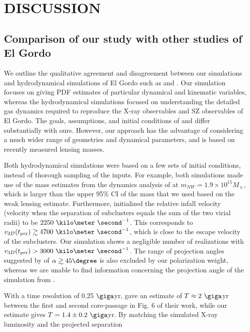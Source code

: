 \documentclass[letterpaper,useAMS,usenatbib]{mn2e}
\begin{document}
\section{DISCUSSION}
\subsection{Comparison of our study with other studies of El Gordo}
We outline the qualitative agreement and disagreement between our
simulations and hydrodynamical simulations of El Gordo such as
\cite{Donnert13} and \cite{Molnar14}. Our simulation focuses on giving PDF
estimates of particular dynamical and kinematic variables, whereas the
hydrodynamical simulations focused on understanding the detailed gas dynamics
required to reproduce the X-ray observables and SZ 
observables of El Gordo. The goals,
assumptions, and initial conditions of \cite{Donnert13} and \cite{Molnar14}
differ substantially with ours. However, our approach has the advantage of considering a much wider range of geometries and dynamical parameters, and is based on recently measured lensing masses.
\par 
Both hydrodynamical simulations were based on a few sets of initial
conditions, instead of thorough sampling of the inputs. For example, both
simulations made use of the mass estimates from the dynamics analysis
of  at $m_{NW} = 1.9 \times
10^{15} M_{\sun}$,
which is larger than the upper 95\% CI of the mass that we used based on
the weak lensing estimate.
Furthermore, \cite{Molnar14} initialized the relative infall velocity
(velocity when the separation of subclusters equals the sum of the two virial
radii) to be $2250~\kilo \meter~ \second^{-1}$. This corresponds to
$v_{3D}(t_{\rm per}) \gtrsim 4700~\kilo \meter~\second^{-1}$, which is close to
the escape velocity of the subclusters. 
Our simulation shows 
a negligible number of realizations with $v_{3D}(t_{\rm per}) >
3000~\kilo\meter~\second^{-1}$. 
The range of projection angles suggested by
\cite{Molnar14} of $\alpha \gtrsim 45\degree$ is also excluded by our
polarization weight, whereas we are unable to find information concerning
the projection angle of the simulation from \cite{Donnert13}.\par 
With a time resolution of 0.25 $\giga$yr,
\cite{Donnert13} gave an estimate of  $T\approx 2~\giga$yr between the
first and second core-passage in Fig. 6 of their work, while our estimate gives $T
= 1.4\pm {0.2}~\giga$yr. 
By matching the simulated X-ray luminosity and the projected separation
\end{document}
